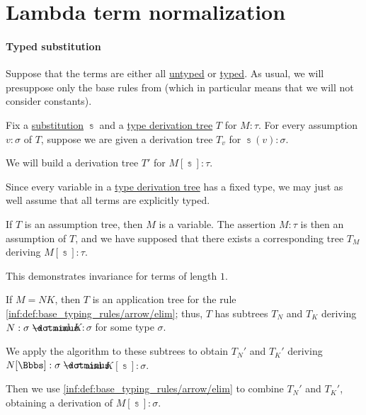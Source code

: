 \section{Lambda term normalization}\label{sec:lambda_term_normalization}

\paragraph{Typed substitution}

\begin{algorithm}\label{alg:typed_substitution}
  Suppose that the terms are either all \hyperref[def:lambda_term]{untyped} or \hyperref[def:typed_lambda_term]{typed}. As usual, we will presuppose only the base rules from  (which in particular means that we will not consider constants).

  Fix a \hyperref[def:lambda_substitution]{substitution} \( \Bbbs \) and a \hyperref[def:type_derivation_tree]{type derivation tree} \( T \) for \( M: \tau \). For every assumption \( v: \sigma \) of \( T \), suppose we are given a derivation tree \( T_v \) for \( \Bbbs(v): \sigma \).

  We will build a derivation tree \( T' \) for \( M[\Bbbs]: \tau \).

  Since every variable in a \hyperref[def:type_derivation_tree]{type derivation tree} has a fixed type, we may just as well assume that all terms are explicitly typed.

  \begin{thmenum}
     If \( T \) is an assumption tree, then \( M \) is a variable. The assertion \( M: \tau \) is then an assumption of \( T \), and we have supposed that there exists a corresponding tree \( T_M \) deriving \( M[\Bbbs]: \tau \).

    This demonstrates invariance for terms of length \( 1 \).

     If \( M = NK \), then \( T \) is an application tree for the rule \ref{inf:def:base_typing_rules/arrow/elim}; thus, \( T \) has subtrees \( T_N \) and \( T_K \) deriving \( N: \sigma \synimplies \tau \) and \( K: \sigma \) for some type \( \sigma \).

    We apply the algorithm to these subtrees to obtain \( T_N' \) and \( T_K' \) deriving \( N[\Bbbs]: \sigma \synimplies \tau \) and \( K[\Bbbs]: \sigma \).

    Then we use \ref{inf:def:base_typing_rules/arrow/elim} to combine \( T_N' \) and \( T_K' \), obtaining a derivation of \( M[\Bbbs]: \sigma \).


\end{thmenum}
\end{algorithm}
